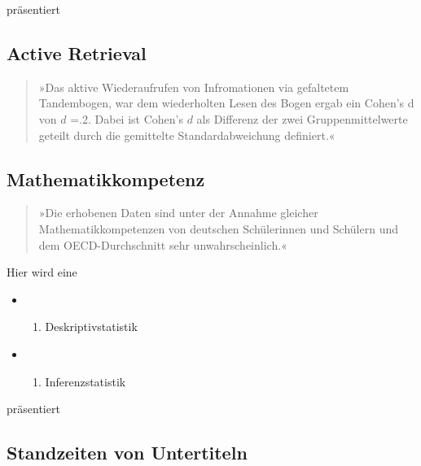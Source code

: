 \documentclass[
  letterpaper,
  DIV=11]{scrreprt}
\providecommand{\tightlist}{%
  \setlength{\itemsep}{0pt}\setlength{\parskip}{0pt}}\usepackage{longtable,booktabs,array}
\begin{document}
präsentiert

\subsection*{Active Retrieval}\label{active-retrieval}

\begin{quote}
»Das aktive Wiederaufrufen von Infromationen via gefaltetem Tandembogen,
war dem wiederholten Lesen des Bogen ergab ein Cohen's d von \(d\) =.2.
Dabei ist Cohen's \(d\) als Differenz der zwei Gruppenmittelwerte
geteilt durch die gemittelte Standardabweichung definiert.«
\end{quote}

\subsection*{Mathematikkompetenz}\label{mathematikkompetenz}

\begin{quote}
»Die erhobenen Daten sind unter der Annahme gleicher
Mathematikkompetenzen von deutschen Schülerinnen und Schülern und dem
OECD-Durchschnitt sehr unwahrscheinlich.«
\end{quote}

Hier wird eine

\begin{itemize}
\item
  \begin{enumerate}
  \def\labelenumi{(\Alph{enumi})}
  \tightlist
  \item
    Deskriptivstatistik\\
  \end{enumerate}
\item
  \begin{enumerate}
  \def\labelenumi{(\Alph{enumi})}
  \setcounter{enumi}{1}
  \tightlist
  \item
    Inferenzstatistik
  \end{enumerate}
\end{itemize}

präsentiert

\subsection*{Standzeiten von
Untertiteln}\label{standzeiten-von-untertiteln}
\end{document}
